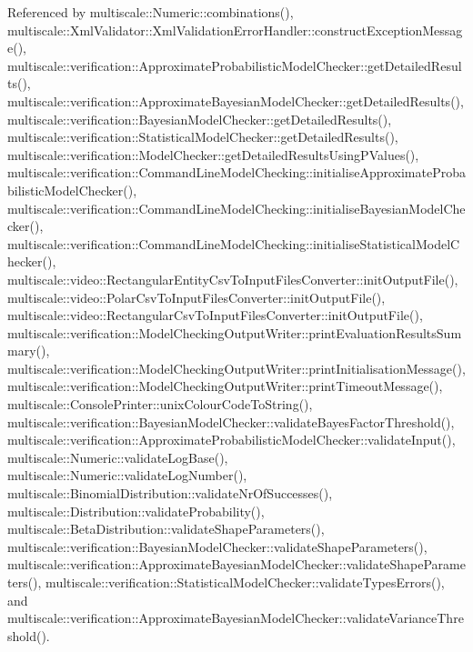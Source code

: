 Referenced by multiscale\-::\-Numeric\-::combinations(), multiscale\-::\-Xml\-Validator\-::\-Xml\-Validation\-Error\-Handler\-::construct\-Exception\-Message(), multiscale\-::verification\-::\-Approximate\-Probabilistic\-Model\-Checker\-::get\-Detailed\-Results(), multiscale\-::verification\-::\-Approximate\-Bayesian\-Model\-Checker\-::get\-Detailed\-Results(), multiscale\-::verification\-::\-Bayesian\-Model\-Checker\-::get\-Detailed\-Results(), multiscale\-::verification\-::\-Statistical\-Model\-Checker\-::get\-Detailed\-Results(), multiscale\-::verification\-::\-Model\-Checker\-::get\-Detailed\-Results\-Using\-P\-Values(), multiscale\-::verification\-::\-Command\-Line\-Model\-Checking\-::initialise\-Approximate\-Probabilistic\-Model\-Checker(), multiscale\-::verification\-::\-Command\-Line\-Model\-Checking\-::initialise\-Bayesian\-Model\-Checker(), multiscale\-::verification\-::\-Command\-Line\-Model\-Checking\-::initialise\-Statistical\-Model\-Checker(), multiscale\-::video\-::\-Rectangular\-Entity\-Csv\-To\-Input\-Files\-Converter\-::init\-Output\-File(), multiscale\-::video\-::\-Polar\-Csv\-To\-Input\-Files\-Converter\-::init\-Output\-File(), multiscale\-::video\-::\-Rectangular\-Csv\-To\-Input\-Files\-Converter\-::init\-Output\-File(), multiscale\-::verification\-::\-Model\-Checking\-Output\-Writer\-::print\-Evaluation\-Results\-Summary(), multiscale\-::verification\-::\-Model\-Checking\-Output\-Writer\-::print\-Initialisation\-Message(), multiscale\-::verification\-::\-Model\-Checking\-Output\-Writer\-::print\-Timeout\-Message(), multiscale\-::\-Console\-Printer\-::unix\-Colour\-Code\-To\-String(), multiscale\-::verification\-::\-Bayesian\-Model\-Checker\-::validate\-Bayes\-Factor\-Threshold(), multiscale\-::verification\-::\-Approximate\-Probabilistic\-Model\-Checker\-::validate\-Input(), multiscale\-::\-Numeric\-::validate\-Log\-Base(), multiscale\-::\-Numeric\-::validate\-Log\-Number(), multiscale\-::\-Binomial\-Distribution\-::validate\-Nr\-Of\-Successes(), multiscale\-::\-Distribution\-::validate\-Probability(), multiscale\-::\-Beta\-Distribution\-::validate\-Shape\-Parameters(), multiscale\-::verification\-::\-Bayesian\-Model\-Checker\-::validate\-Shape\-Parameters(), multiscale\-::verification\-::\-Approximate\-Bayesian\-Model\-Checker\-::validate\-Shape\-Parameters(), multiscale\-::verification\-::\-Statistical\-Model\-Checker\-::validate\-Types\-Errors(), and multiscale\-::verification\-::\-Approximate\-Bayesian\-Model\-Checker\-::validate\-Variance\-Threshold().



